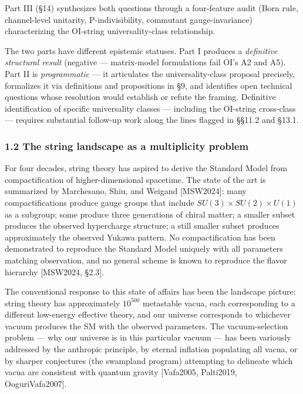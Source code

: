 \documentclass[
]{article}
\begin{document}
Part III (§14) synthesizes both questions through a four-feature audit
(Born rule, channel-level unitarity, P-indivisibility, commutant
gauge-invariance) characterizing the OI-string universality-class
relationship.

The two parts have different epistemic statuses. Part I produces a
\emph{definitive structural result} (negative --- matrix-model
formulations fail OI's A2 and A5). Part II is \emph{programmatic} --- it
articulates the universality-class proposal precisely, formalizes it via
definitions and propositions in §9, and identifies open technical
questions whose resolution would establish or refute the framing.
Definitive identification of specific universality classes --- including
the OI-string cross-class --- requires substantial follow-up work along
the lines flagged in §§11.2 and §13.1.

\hypertarget{the-string-landscape-as-a-multiplicity-problem}{%
\subsubsection{1.2 The string landscape as a multiplicity
problem}\label{the-string-landscape-as-a-multiplicity-problem}}

For four decades, string theory has aspired to derive the Standard Model
from compactification of higher-dimensional spacetime. The state of the
art is summarized by Marchesano, Shiu, and Weigand {[}MSW2024{]}: many
compactifications produce gauge groups that include
\(SU(3) \times SU(2) \times U(1)\) as a subgroup; some produce three
generations of chiral matter; a smaller subset produces the observed
hypercharge structure; a still smaller subset produces approximately the
observed Yukawa pattern. No compactification has been demonstrated to
reproduce the Standard Model uniquely with all parameters matching
observation, and no general scheme is known to reproduce the flavor
hierarchy {[}MSW2024, §2.3{]}.

The conventional response to this state of affairs has been the
landscape picture: string theory has approximately \(10^{500}\)
metastable vacua, each corresponding to a different low-energy effective
theory, and our universe corresponds to whichever vacuum produces the SM
with the observed parameters. The vacuum-selection problem --- why our
universe is in this particular vacuum --- has been variously addressed
by the anthropic principle, by eternal inflation populating all vacua,
or by sharper conjectures (the swampland program) attempting to
delineate which vacua are consistent with quantum gravity {[}Vafa2005,
Palti2019, OoguriVafa2007{]}.
\end{document}
